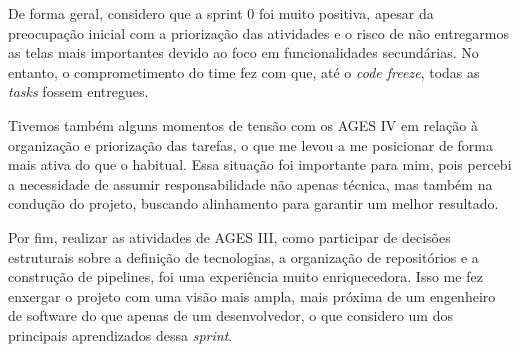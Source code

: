 \begin{reflection}
\indent \originaltab{}De forma geral, considero que a sprint 0 foi muito positiva, apesar da preocupação inicial com a priorização das atividades e o risco de não entregarmos as telas mais importantes devido ao foco em funcionalidades secundárias. No entanto, o comprometimento do time fez com que, até o \textit{code freeze}, todas as \textit{tasks} fossem entregues.\par

\indent \originaltab{}Tivemos também alguns momentos de tensão com os AGES IV em relação à organização e priorização das tarefas, o que me levou a me posicionar de forma mais ativa do que o habitual. Essa situação foi importante para mim, pois percebi a necessidade de assumir responsabilidade não apenas técnica, mas também na condução do projeto, buscando alinhamento para garantir um melhor resultado.\par

\indent \originaltab{}Por fim, realizar as atividades de AGES III, como participar de decisões estruturais sobre a definição de tecnologias, a organização de repositórios e a construção de pipelines, foi uma experiência muito enriquecedora. Isso me fez enxergar o projeto com uma visão mais ampla, mais próxima de um engenheiro de software do que apenas de um desenvolvedor, o que considero um dos principais aprendizados dessa \textit{sprint}.\par

\end{reflection}
